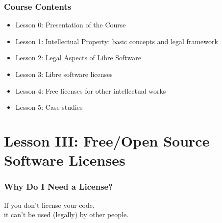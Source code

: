 

\begin{frame}
  \frametitle{Course Contents}

  \begin{itemize}
    \item Lesson 0: Presentation of the Course
    \item Lesson 1: Intellectual Property: basic concepts and legal framework
    \item Lesson 2: Legal Aspects of Libre Software
    \item \alert{Lesson 3: Libre software licenses}
    \item Lesson 4: Free licenses for other intellectual works
    \item Lesson 5: Case studies
  \end{itemize}

\end{frame}


\section{Lesson III: Free/Open Source Software Licenses}


\begin{frame}
\frametitle{Why Do I Need a License?}

\pause

\begin{center}
\Large{If you don't license your code,\\ it can't be used (legally) by other people.}
\end{center}

\end{frame}





